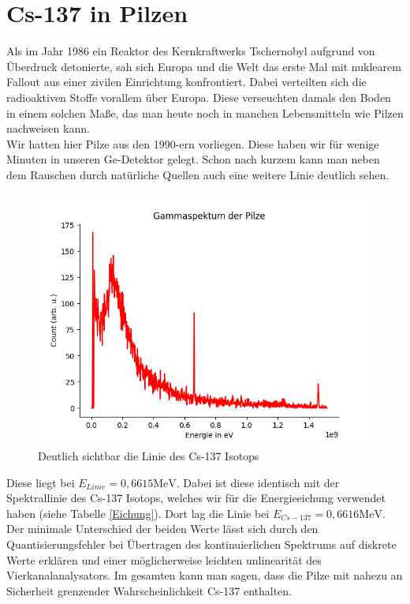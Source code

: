 \section{Cs-137 in Pilzen}

Als im Jahr 1986 ein Reaktor des Kernkraftwerks Tschernobyl aufgrund von Überdruck detonierte, sah sich Europa und die Welt das erste Mal mit 
nuklearem Fallout aus einer zivilen Einrichtung konfrontiert. Dabei verteilten sich die radioaktiven Stoffe vorallem über Europa. Diese verseuchten 
damals den Boden in einem solchen Maße, das man heute noch in manchen Lebensmitteln wie Pilzen nachweisen kann.\\
Wir hatten hier Pilze aus den 1990-ern vorliegen. Diese haben wir für wenige Minuten in unseren Ge-Detektor gelegt. Schon nach kurzem kann man 
neben dem Rauschen durch natürliche Quellen auch eine weitere Linie deutlich sehen.

\begin{figure}[ht]
    \centering
    \includegraphics[width = 12cm]{Bilder/Auswertung/Pilze.png}
    \caption{Deutlich sichtbar die Linie des Cs-137 Isotops}
\end{figure}

Diese liegt bei $E_{Linie} =0,6615 \mathrm{MeV}$. Dabei ist diese identisch mit der Spektrallinie des Cs-137 Isotops, welches wir für die 
Energieeichung verwendet haben (siehe Tabelle \ref{Eichung}). Dort lag die Linie bei $E_{Cs-137} = 0,6616 \mathrm{MeV}$.\\
Der minimale Unterschied der beiden Werte lässt sich durch den 
Quantisierungsfehler bei Übertragen des kontinuierlichen Spektrums auf diskrete Werte erklären und einer möglicherweise leichten unlinearität des Vierkanalanalysators.
Im gesamten kann man sagen, dass die Pilze mit nahezu an Sicherheit grenzender Wahrscheinlichkeit Cs-137 enthalten.
